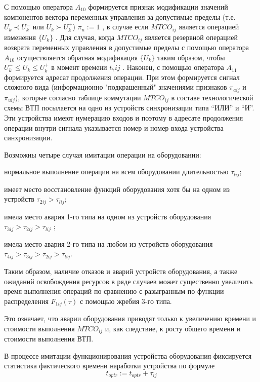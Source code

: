 С помощью оператора $A_{10}$ формируется признак модификации значений компонентов вектора переменных управления за допустимые пределы (т.е. $U_k \prec U_k^-$ или $U_k \succ  U_k^+$)  $\pi_{u}:=1$ ,	 в случае если $MTCO_{ij}$ является операцией  изменения $\{U_k\}$ . Для случая, когда $MTCO_{ij}$ является резервной операцией возврата переменных управления в допустимые пределы с помощью оператора $A_{10}$ осуществляется обратная модификация $\{U_k\}$ таким образом, чтобы $U_k^-  \leq  U_k  \leq U_k^+$   в момент времени $t_7ij$ . Наконец, с помощью оператора $A_{11}$ формируется адресат продолжения операции. При этом формируется сигнал сложного вида (информационно "подкрашенный"{} значениями признаков $\pi_{aij}$ и $\pi_{uij}$), которые согласно таблице коммутации $MTCO_{ij}$ в составе технологической схемы ВТП посылается на одно из устройств синхронизации типа ``ИЛИ'' и ``И''.  Эти устройства имеют нумерацию входов и поэтому в  адресате продолжения операции внутри сигнала указывается номер и номер входа устройства синхронизации.

Возможны четыре случая имитации операции на оборудовании:
\begin{textitemize}
    \item нормальное выполнение операции на всем оборудовании длительностью $\tau_{lij}$;
    \item имеет место восстановление функций оборудования хотя бы на одном из устройств $\tau_{2ij}>\tau_{lij}$;
    \item имела место авария 1-го типа на одном из устройств оборудования $\tau_{3ij}>\tau_{2ij}>\tau_{lij}$ ;
    \item имела место авария 2-го типа на любом из устройств оборудования  $\tau_{4ij}>\tau_{3ij}>\tau_{2ij}>\tau_{lij}$.
\end{textitemize}

Таким образом, наличие отказов и аварий устройств оборудования, а также ожиданий освобождения ресурсов в ряде случаев может существенно увеличить время выполнения операций по сравнению с разыгранным по функции распределения $F_{1ij}(\tau)$ с помощью жребия 3-го типа.

Это означает, что аварии оборудования приводят только к увеличению времени и стоимости выполнения $MTCO_{ij}$ и, как следствие, к росту общего времени и стоимости выполнения ВТП.



В процессе имитации функционирования устройства оборудования фиксируется статистика фактического времени наработки устройства по формуле
\begin{equation*}
		t_{optr}:=t_{optr}+\tau_{ij}
\end{equation*}

